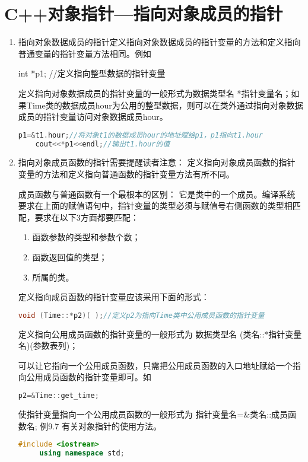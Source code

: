 \chapter{C++对象指针—指向对象成员的指针}

\begin{enumerate}
\item 指向对象数据成员的指针定义指向对象数据成员的指针变量的方法和定义指向普通变量的指针变量方法相同。例如
  
  int *p1; //定义指向整型数据的指针变量

  定义指向对象数据成员的指针变量的一般形式为数据类型名 *指针变量名；如果Time类的数据成员hour为公用的整型数据，则可以在类外通过指向对象数据成员的指针变量访问对象数据成员hour。
  \begin{lstlisting}[language=c++]
    p1=&t1.hour;//将对象t1的数据成员hour的地址赋给p1，p1指向t1.hour
    cout<<*p1<<endl;//输出t1.hour的值
  \end{lstlisting}

\item 指向对象成员函数的指针需要提醒读者注意： 定义指向对象成员函数的指针变量的方法和定义指向普通函数的指针变量方法有所不同。
  
  成员函数与普通函数有一个最根本的区别： 它是类中的一个成员。编译系统要求在上面的赋值语句中，指针变量的类型必须与赋值号右侧函数的类型相匹配，要求在以下3方面都要匹配：
  \begin{enumerate}
    \itemsep=-3pt
  \item 函数参数的类型和参数个数；
  \item 函数返回值的类型；
  \item 所属的类。
  \end{enumerate}

  定义指向成员函数的指针变量应该采用下面的形式：
  \begin{lstlisting}[language=c++]
    void (Time::*p2)( );//定义p2为指向Time类中公用成员函数的指针变量
  \end{lstlisting}
  
   定义指向公用成员函数的指针变量的一般形式为
   数据类型名 (类名::*指针变量名)(参数表列)；

   可以让它指向一个公用成员函数，只需把公用成员函数的入口地址赋给一个指向公用成员函数的指针变量即可。如
   \begin{lstlisting}[language=c++]
     p2=&Time::get_time;
   \end{lstlisting}
   使指针变量指向一个公用成员函数的一般形式为
   指针变量名=\&类名::成员函数名;
   例9.7 有关对象指针的使用方法。
   \begin{lstlisting}[language=c++]
     #include <iostream>
     using namespace std;


\end{lstlisting}
\end{enumerate}
